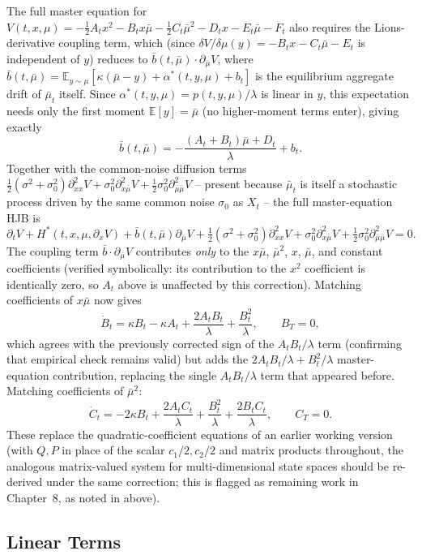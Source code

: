 The full master equation for $V(t,x,\mu)=-\tfrac12A_tx^2-B_tx\bar\mu-\tfrac12C_t\bar\mu^2
-D_tx-E_t\bar\mu-F_t$ also requires the Lions-derivative coupling term,
which (since $\delta V/\delta\mu(y)=-B_tx-C_t\bar\mu-E_t$ is independent of
$y$) reduces to $\bar{b}(t,\bar\mu)\cdot\partial_{\bar\mu}V$, where
$\bar{b}(t,\bar\mu)=\mathbb{E}_{y\sim\mu}[\kappa(\bar\mu-y)+\alpha^*(t,y,\mu)+b_t]$
is the equilibrium aggregate drift of $\bar\mu_t$ itself. Since
$\alpha^*(t,y,\mu)=p(t,y,\mu)/\lambda$ is linear in $y$, this expectation
needs only the first moment $\mathbb{E}[y]=\bar\mu$ (no higher-moment terms
enter), giving exactly
\[
    \bar{b}(t,\bar\mu) = -\frac{(A_t+B_t)\bar\mu + D_t}{\lambda} + b_t.
\]
Together with the common-noise diffusion terms
$\tfrac12(\sigma^2+\sigma_0^2)\partial^2_{xx}V+\sigma_0^2\partial^2_{x\bar\mu}V
+\tfrac12\sigma_0^2\partial^2_{\bar\mu\bar\mu}V$ -- present because $\bar\mu_t$
is itself a stochastic process driven by the same common noise $\sigma_0$ as
$X_t$ -- the full master-equation HJB is
\[
    \partial_tV + H^*(t,x,\mu,\partial_xV) + \bar{b}(t,\bar\mu)\partial_{\bar\mu}V
    + \tfrac12(\sigma^2+\sigma_0^2)\partial^2_{xx}V + \sigma_0^2\partial^2_{x\bar\mu}V
    + \tfrac12\sigma_0^2\partial^2_{\bar\mu\bar\mu}V = 0.
\]
The coupling term $\bar{b}\cdot\partial_{\bar\mu}V$ contributes \emph{only}
to the $x\bar\mu$, $\bar\mu^2$, $x$, $\bar\mu$, and constant coefficients
(verified symbolically: its contribution to the $x^2$ coefficient is
identically zero, so $A_t$ above is unaffected by this correction).
Matching coefficients of $x\bar\mu$ now gives
\[
    \dot{B}_t = \kappa B_t - \kappa A_t + \frac{2A_tB_t}{\lambda} +
    \frac{B_t^2}{\lambda}, \qquad B_T = 0,
\]
which agrees with the previously corrected sign of the $A_tB_t/\lambda$ term
(confirming that empirical check remains valid) but adds the
$2A_tB_t/\lambda+B_t^2/\lambda$ master-equation contribution, replacing the
single $A_tB_t/\lambda$ term that appeared before. Matching coefficients of
$\bar\mu^2$:
\[
    \dot{C}_t = -2\kappa B_t + \frac{2A_tC_t}{\lambda} + \frac{B_t^2}{\lambda} +
    \frac{2B_tC_t}{\lambda}, \qquad C_T = 0.
\]
These replace the quadratic-coefficient equations of an earlier working
version (with $Q,P$ in place of
the scalar $c_1/2,c_2/2$ and matrix products throughout, the analogous
matrix-valued system for multi-dimensional state spaces should be re-derived
under the same correction; this is flagged as remaining work in
Chapter~8, as noted in  above).

\subsection{Linear Terms}

